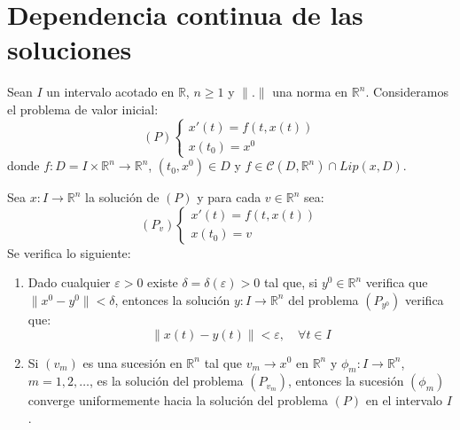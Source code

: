 \section{Dependencia continua de las soluciones}
\begin{theorem}
    Sean $I$ un intervalo acotado en $\mathbb{R}$, $n \geq 1$ y $\|.\|$ una norma en $\mathbb{R}^n$.
    Consideramos el problema de valor inicial:
    $$(P) \begin{cases}
            x'(t) = f(t, x(t)) \\
            x(t_0) = x^0
        \end{cases}$$
    donde $f: D = I \times \mathbb{R}^n \to \mathbb{R}^n$, $(t_0, x^0) \in D$ y $f \in \mathcal{C}(D, \mathbb{R}^n) \cap Lip(x, D)$.

    Sea $x: I \to \mathbb{R}^n$ la solución de $(P)$ y para cada $v \in \mathbb{R}^n$ sea:
    $$(P_v) \begin{cases}
            x'(t) = f(t, x(t)) \\
            x(t_0) = v
        \end{cases}$$
    Se verifica lo siguiente:
    \begin{enumerate}
        \item Dado cualquier $\varepsilon > 0$ existe $\delta = \delta(\varepsilon) > 0$ tal que, si $y^0 \in \mathbb{R}^n$ verifica que $\|x^0 - y^0\| < \delta$, entonces la solución $y: I \to \mathbb{R}^n$ del problema $(P_{y^0})$ verifica que:
              $$\|x(t) - y(t)\| < \varepsilon, \quad \forall t \in I$$
        \item Si $(v_m)$ es una sucesión en $\mathbb{R}^n$ tal que $v_m \to x^0$ en $\mathbb{R}^n$ y $\phi_m: I \to \mathbb{R}^n$, $m = 1, 2, \dots$, es la solución del problema $(P_{v_m})$, entonces la sucesión $(\phi_m)$ converge uniformemente hacia la solución del problema $(P)$ en el intervalo $I$.
    \end{enumerate}
\end{theorem}